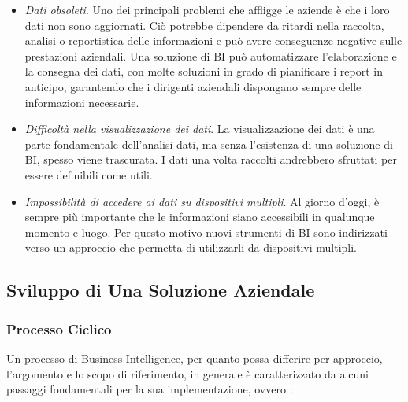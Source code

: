 \begin{itemize}
    \item \textit{Dati obsoleti}. Uno dei principali problemi che affligge le aziende è che i loro dati non sono aggiornati. Ciò potrebbe dipendere da ritardi nella raccolta, analisi o reportistica delle informazioni e può avere conseguenze negative sulle prestazioni aziendali. Una soluzione di BI può automatizzare l'elaborazione e la consegna dei dati, con molte soluzioni in grado di pianificare i report in anticipo, garantendo che i dirigenti aziendali dispongano sempre delle informazioni necessarie.
    \item \textit{Difficoltà nella visualizzazione dei dati}. La visualizzazione dei dati è una parte fondamentale dell'analisi dati, ma senza l'esistenza di una soluzione di BI, spesso viene trascurata. I dati una volta raccolti andrebbero sfruttati per essere definibili come utili.
    \item \textit{Impossibilità di accedere ai dati su dispositivi multipli}. Al giorno d'oggi, è sempre più importante che le informazioni siano accessibili in qualunque momento e luogo. Per questo motivo nuovi strumenti di BI sono indirizzati verso un approccio che permetta di utilizzarli da dispositivi multipli.
\end{itemize}

\subsection{Sviluppo di Una Soluzione Aziendale}

\subsubsection{Processo Ciclico}
Un processo di Business Intelligence, per quanto possa differire per approccio, l'argomento e lo scopo di riferimento, in generale è caratterizzato da alcuni passaggi fondamentali per la sua implementazione, ovvero \cite{citeseerx_bi_process}:

